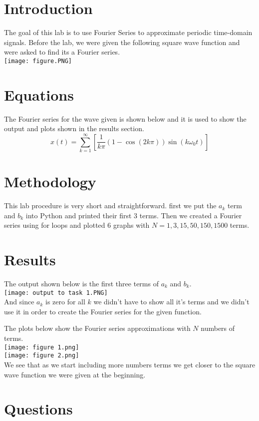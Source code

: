 \documentclass[12pt]{report}
\begin{document}
\section{Introduction}
The goal of this lab is to use Fourier Series to approximate periodic time-domain signals. Before the lab, we were given the following square wave function and were asked to find its a Fourier series. \\
\texttt{[image: figure.PNG]}


\section{Equations}
The Fourier series for the wave given is shown below and it is used to show the output and plots shown in the results section.
$$x(t) = \sum_{k=1}^{\infty}[\frac{1}{k\pi}( 1-\cos{(2k\pi)}) \sin{(k\omega_0 t)}]$$

\section{Methodology}
This lab procedure is very short and straightforward. first we put the $a_k$ term and $b_k$ into Python and printed their first 3 terms. Then we created a Fourier series using for loops and plotted 6 graphs with $N = {1, 3, 15, 50, 150, 1500}$ terms.
   
\section{Results}
The output shown below is the first three terms of $a_k$ and $b_k$. \\
\texttt{[image: output to task 1.PNG]}\\
And since $a_k$ is zero for all $k$ we didn't have to show all it's terms and we didn't use it in order to create the Fourier series for the given function.

The plots below show the Fourier series approximations with $N$ numbers of terms.\\
\texttt{[image: figure 1.png]}\\
\texttt{[image: figure 2.png]}\\
We see that as we start including more numbers terms we get closer to the square wave function we were given at the beginning.

\section{Questions}
\end{document}
